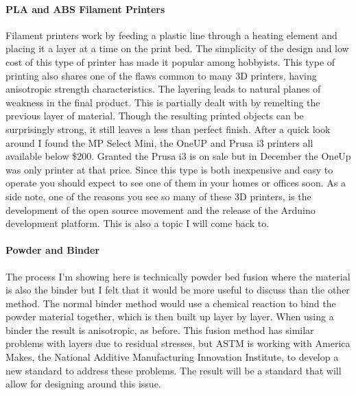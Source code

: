 \documentclass[12pt]{article}
\begin{document}
\paragraph{PLA and ABS Filament Printers}


Filament printers work by feeding a plastic line through a heating element and placing it a layer at a time on the print bed.  The simplicity of the design and low cost of this type of printer has made it popular among hobbyists.  This type of printing also shares one of the flaws common to many 3D printers, having anisotropic strength characteristics.  The layering leads to natural planes of weakness in the final product.  This is partially dealt with by remelting the previous layer of material.  Though the resulting printed objects can be surprisingly strong, it still leaves a less than perfect finish.  After a quick look around I found the MP Select Mini, the OneUP and Prusa i3 printers all available below \$200.  Granted the Prusa i3 is on sale but in December the OneUp was only printer at that price.  Since this type is both inexpensive and easy to operate you should expect to see one of them in your homes or offices soon.  As a side note, one of the reasons you see so many of these 3D printers, is the development of the open source movement and the release of the Arduino development platform.  This is also a topic I will come back to.
\paragraph{Powder and Binder}
The process I'm showing here is technically powder bed fusion where the material is also the binder but I felt that it would be more useful to discuss than the other method.  The normal binder method would use a chemical reaction to bind the powder material together, which is then built up layer by layer.  When using a binder the result is anisotropic, as before.  This fusion method has similar problems with layers due to residual stresses, but ASTM is working with America Makes, the National Additive Manufacturing Innovation Institute, to develop a new standard to address these problems.  The result will be a standard that will allow for designing around this issue.
\end{document}
